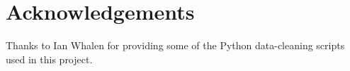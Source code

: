 \section{Acknowledgements}

Thanks to Ian Whalen for providing some of the Python data-cleaning scripts used in this project.